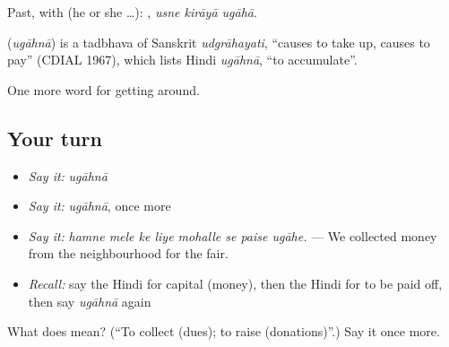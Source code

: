 Past, with  (he or she …):   , \emph{usne kirāyā ugāhā}.

\begin{cousinweb}
\textbf{} (\emph{ugāhnā}) is a tadbhava of Sanskrit \emph{udgrāhayati}, \textquotedblleft{}causes to take up, causes to pay\textquotedblright{} (CDIAL 1967), which lists Hindi \emph{ugāhnā}, \textquotedblleft{}to accumulate\textquotedblright{}.
\end{cousinweb}

\begin{grammarlens}[title={What you've built}]
One more word for getting around.
\end{grammarlens}

\subsection*{Your turn}
\begin{itemize}
\raggedright
  \item \emph{Say it:} \emph{ugāhnā}
  \item \emph{Say it:} \emph{ugāhnā}, once more
  \item \emph{Say it:} \emph{hamne mele ke liye mohalle se paise ugāhe.} — We collected money from the neighbourhood for the fair.
  \item \emph{Recall:} say the Hindi for capital (money), then the Hindi for to be paid off, then say \emph{ugāhnā} again
\end{itemize}

\begin{tcolorbox}[breakable,colback=teal!4,colframe=teal!35!black,title={Before you move on}]
What does  mean? (\textquotedblleft{}To collect (dues); to raise (donations)\textquotedblright{}.) Say it once more.
\end{tcolorbox}
